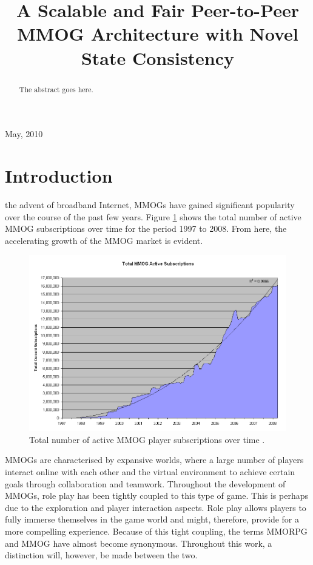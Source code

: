 \documentclass[journal,oneside,a4paper,onecolumn]{IEEEtran}
\begin{document}
%
\title{A Scalable and Fair Peer-to-Peer MMOG Architecture with Novel State Consistency}

\author{
}

\maketitle

\begin{abstract}
The abstract goes here.
\end{abstract}

\hfill May, 2010

\section{Introduction}


 the advent of broadband Internet, \acp{MMOG} have gained significant popularity over the course of the past few years.
Figure \ref{fig_mmog_subscriptions} shows the total number of active MMOG subscriptions over time for the period 1997 to 2008. From here, the accelerating growth of the MMOG market is evident.
%
\begin{figure}[htbp]
 \centering
 \includegraphics[width=0.7\columnwidth]{MMOG_subscriptions}
 \caption{Total number of active MMOG player subscriptions over time \cite{mmo_growth_chart}.}
 \label{fig_mmog_subscriptions}
\end{figure}

\acp{MMOG} are characterised by expansive worlds, where a large number of players interact online with each other and the virtual environment to achieve certain goals through collaboration and teamwork. Throughout the development of \acp{MMOG}, role play has been tightly coupled to this type of game. This is perhaps due to the exploration and player interaction aspects. Role play allows players to fully immerse themselves in the game world and might, therefore, provide for a more compelling experience. Because of this tight coupling, the terms \ac{MMORPG} and \ac{MMOG} have almost become synonymous. Throughout this work, a distinction will, however, be made between the two.
\end{document}
